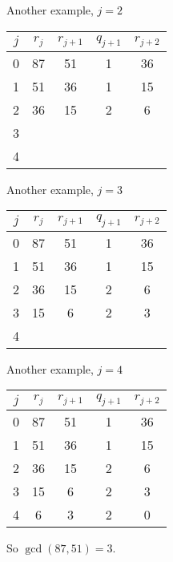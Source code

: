 \documentclass[handout]{beamer}
\begin{document}
\begin{frame}{Another example, $j=2$}

\begin{tabular}{|c|c|c|c|c|}\hline
$j$   &  $r_{j}$    & $r_{j+1}$ & $q_{j+1}$ & $r_{j+2}$ \\ \hline\hline
0     &  87         &  51       &    1      &   36      \\ \hline
1     &  51         &  36       &    1      &   15      \\ \hline
2     &  36         &  15       &    2      &   6       \\ \hline
3     &             &           &           &           \\ \hline
4     &             &           &           &           \\ \hline
\end{tabular}

\end{frame}

\begin{frame}{Another example, $j=3$}

\begin{tabular}{|c|c|c|c|c|}\hline
$j$   &  $r_{j}$    & $r_{j+1}$ & $q_{j+1}$ & $r_{j+2}$ \\ \hline\hline
0     &  87         &  51       &    1      &   36      \\ \hline
1     &  51         &  36       &    1      &   15      \\ \hline
2     &  36         &  15       &    2      &   6       \\ \hline
3     &  15         &   6       &    2      &   3       \\ \hline
4     &             &           &           &           \\ \hline
\end{tabular}

\end{frame}

\begin{frame}{Another example, $j=4$}

\begin{tabular}{|c|c|c|c|c|}\hline
$j$   &  $r_{j}$    & $r_{j+1}$ & $q_{j+1}$ & $r_{j+2}$ \\ \hline\hline
0     &  87         &  51       &    1      &   36      \\ \hline
1     &  51         &  36       &    1      &   15      \\ \hline
2     &  36         &  15       &    2      &   6       \\ \hline
3     &  15         &   6       &    2      &   3       \\ \hline
4     &   6         &   3       &    2      &   0       \\ \hline
\end{tabular}

\vspace{1em}

So $\gcd(87,51) = 3$.

\end{frame}
\end{document}
